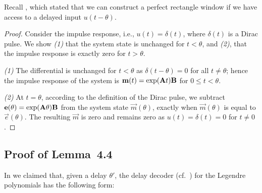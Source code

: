 Recall , which stated that we can construct a perfect rectangle window if we have access to a delayed input $u(t - \theta)$.

\LemRectangleWindow*

\begin{proof}
Consider the impulse response, i.e., $u(t) = \delta(t)$, where $\delta(t)$ is a Dirac pulse.
We show \emph{(1)} that the system state is unchanged for $t < \theta$, and \emph{(2)}, that the impulse response is exactly zero for $t > \theta$.

\emph{(1)} The differential is unchanged for $t < \theta$ as $\delta(t - \theta) = 0$ for all $t \neq \theta$; hence the impulse response of the system is $\mathbf{m}(t) = \exp(\mathbf{A} t) \mathbf{B}$ for $0 \leq t < \theta$.

\emph{(2)} At $t = \theta$, according to the definition of the Dirac pulse, we subtract $\mathbf{e}(\theta) = \exp(\mathbf{A} \theta) \mathbf{B}$ from the system state $\vec m(\theta)$, exactly when $\vec m(\theta)$ is equal to $\vec e(\theta)$.
The resulting $\vec m$ is zero and remains zero as $u(t) = \delta(t) = 0$ for  $t \neq 0$.
\end{proof}

\subsection{Proof of Lemma~4.4}
\label{app:legendre_delay_decoder_proof}

In  we claimed that, given a delay $\theta'$, the delay decoder (cf.~) for the Legendre polynomials has the following form:

\LemLegendreDelayDecoder*

